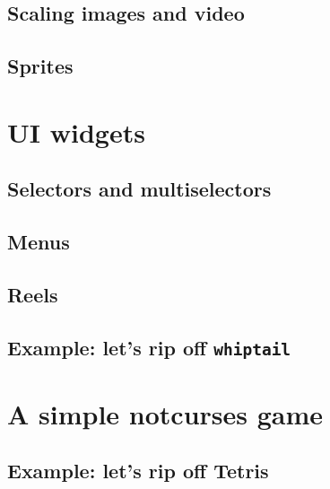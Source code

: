 \documentclass[letterpaper,10pt]{article}
\begin{document}
\subsection{Scaling images and video}
\subsection{Sprites}

\section{UI widgets}
\label{section:uiwidgets}
\subsection{Selectors and multiselectors}
\subsection{Menus}
\subsection{Reels}
\subsection{Example: let's rip off \texttt{whiptail}}

\section{A simple notcurses game}
\subsection{Example: let's rip off Tetris}
\end{document}
